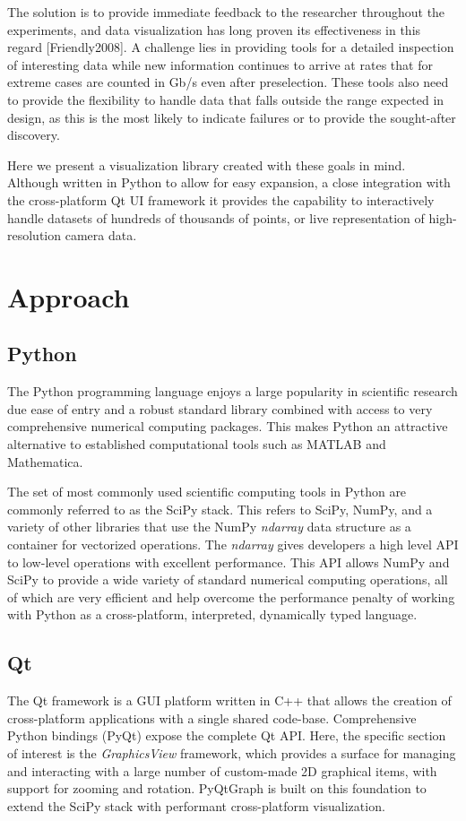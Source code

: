 \documentclass[journal]{vgtc}                %
\begin{document}
The solution is to provide immediate feedback to the researcher throughout the experiments, and data visualization has long proven its effectiveness in this regard [Friendly2008]. A challenge lies in providing tools for a detailed inspection of interesting data while new information continues to arrive at rates that for extreme cases are counted in Gb/s even after preselection\cite{LHC}. These tools also need to provide the flexibility to handle data that falls outside the range expected in design, as this is the most likely to indicate failures or to provide the sought-after discovery.

Here we present a visualization library created with these goals in mind. Although written in Python to allow for easy expansion, a close integration with the cross-platform Qt UI framework\cite{Qt} it provides the capability to interactively handle datasets of hundreds of thousands of points, or live representation of high-resolution camera data.


\section{Approach}
\subsection{Python}
The Python programming language enjoys a large popularity in scientific research due ease of entry and a robust standard library combined with access to very comprehensive numerical computing packages. This makes Python an attractive alternative to established computational tools such as MATLAB\cite{matlab} and Mathematica. %

The set of most commonly used scientific computing tools in Python are commonly referred to as the SciPy stack. %
This refers to SciPy, NumPy, and a variety of other libraries that use the NumPy \emph{ndarray} data structure as a container for vectorized operations. The \emph{ndarray} gives developers a high level API to low-level operations with excellent performance. This API allows NumPy and SciPy to provide a wide variety of standard numerical computing operations, all of which are very efficient and help overcome the performance penalty of working with Python as a cross-platform, interpreted, dynamically typed language.

\subsection{Qt}
The Qt framework is a GUI platform written in C++ that allows the creation of cross-platform applications with a single shared code-base. Comprehensive Python bindings (PyQt) expose the complete Qt API. Here, the specific section of interest is the \emph{GraphicsView} framework, which provides a surface for managing and interacting with a large number of custom-made 2D graphical items, with support for zooming and rotation\cite{QtGraphicsView}. PyQtGraph is built on this foundation to extend the SciPy stack with performant cross-platform visualization.
\end{document}
